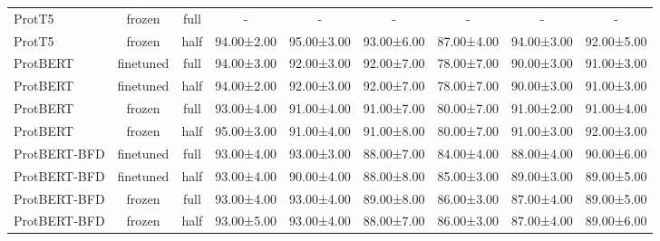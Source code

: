 \begin{tabular}{lcccccccc}
      ProtT5 &         frozen &      full &          - &          - &          - &          - &          - &          - \\
      ProtT5 &         frozen &      half & 94.00±2.00 & 95.00±3.00 & 93.00±6.00 & 87.00±4.00 & 94.00±3.00 & 92.00±5.00 \\
    ProtBERT &      finetuned &      full & 94.00±3.00 & 92.00±3.00 & 92.00±7.00 & 78.00±7.00 & 90.00±3.00 & 91.00±3.00 \\
    ProtBERT &      finetuned &      half & 94.00±2.00 & 92.00±3.00 & 92.00±7.00 & 78.00±7.00 & 90.00±3.00 & 91.00±3.00 \\
    ProtBERT &         frozen &      full & 93.00±4.00 & 91.00±4.00 & 91.00±7.00 & 80.00±7.00 & 91.00±2.00 & 91.00±4.00 \\
    ProtBERT &         frozen &      half & 95.00±3.00 & 91.00±4.00 & 91.00±8.00 & 80.00±7.00 & 91.00±3.00 & 92.00±3.00 \\
ProtBERT-BFD &      finetuned &      full & 93.00±4.00 & 93.00±3.00 & 88.00±7.00 & 84.00±4.00 & 88.00±4.00 & 90.00±6.00 \\
ProtBERT-BFD &      finetuned &      half & 93.00±4.00 & 90.00±4.00 & 88.00±8.00 & 85.00±3.00 & 89.00±3.00 & 89.00±5.00 \\
ProtBERT-BFD &         frozen &      full & 93.00±4.00 & 93.00±4.00 & 89.00±8.00 & 86.00±3.00 & 87.00±4.00 & 89.00±5.00 \\
ProtBERT-BFD &         frozen &      half & 93.00±5.00 & 93.00±4.00 & 88.00±7.00 & 86.00±3.00 & 87.00±4.00 & 89.00±6.00 \\
\bottomrule
\end{tabular}
